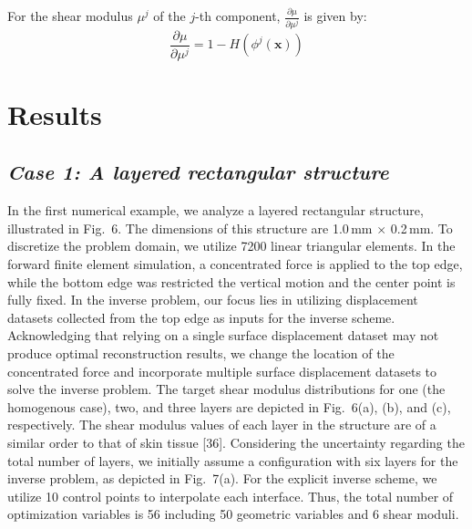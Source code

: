 \documentclass[11pt]{article}
\begin{document}
For the shear modulus $\mu^{j}$ of the $j$-th component,
$\frac{\partial\mu}{\partial\mu^{j}}$ is given by:
\begin{equation}
\frac{\partial\mu}{\partial\mu^{j}}
= 1 - H\!\left(\phi^{j}(\mathbf{x})\right)
\end{equation}

\section*{Results}

\subsection*{\textit{Case 1: A layered rectangular structure}}

\noindent
In the first numerical example, we analyze a layered rectangular
structure, illustrated in Fig.~6. The dimensions of this structure
are 1.0\,mm $\times$ 0.2\,mm. To discretize the problem domain, we
utilize 7200 linear triangular elements. In the forward finite
element simulation, a concentrated force is applied to the top edge,
while the bottom edge was restricted the vertical motion and the
center point is fully fixed. In the inverse problem, our focus lies
in utilizing displacement datasets collected from the top edge as
inputs for the inverse scheme. Acknowledging that relying on a single
surface displacement dataset may not produce optimal reconstruction
results, we change the location of the concentrated force and
incorporate multiple surface displacement datasets to solve the
inverse problem. The target shear modulus distributions for one (the
homogenous case), two, and three layers are depicted in Fig.~6(a),
(b), and (c), respectively. The shear modulus values of each layer in
the structure are of a similar order to that of skin tissue [36].
Considering the uncertainty regarding the total number of layers, we
initially assume a configuration with six layers for the inverse
problem, as depicted in Fig.~7(a). For the explicit inverse scheme,
we utilize 10 control points to interpolate each interface. Thus, the
total number of optimization variables is 56 including 50 geometric
variables and 6 shear moduli.
\end{document}
